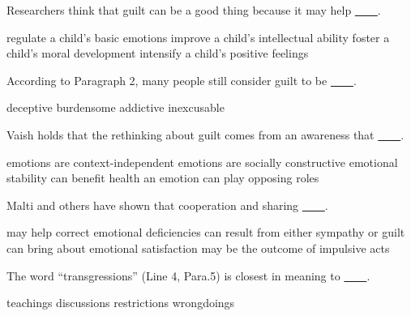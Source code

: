 \item Researchers think that guilt can be a good thing because it may help \uline{~~~~}.
\begin{tasks}
	\task regulate a child's basic emotions
	\task improve a child's intellectual ability
	\task foster a child's moral development
	\task intensify a child's positive feelings
\end{tasks}
\item According to Paragraph 2, many people still consider guilt to be \uline{~~~~}.
\begin{tasks}
	\task deceptive
	\task burdensome
	\task addictive
	\task inexcusable
\end{tasks}
\item Vaish holds that the rethinking about guilt comes from an awareness that \uline{~~~~}.
\begin{tasks}
	\task emotions are context-independent
	\task emotions are socially constructive
	\task emotional stability can benefit health
	\task an emotion can play opposing roles
\end{tasks}
\item Malti and others have shown that cooperation and sharing \uline{~~~~}.
\begin{tasks}
	\task may help correct emotional deficiencies
	\task can result from either sympathy or guilt
	\task can bring about emotional satisfaction
	\task may be the outcome of impulsive acts
\end{tasks}
\item The word ``transgressions'' (Line 4, Para.5) is closest in meaning to \uline{~~~~}.
\begin{tasks}
	\task teachings
	\task discussions
	\task restrictions
	\task wrongdoings
\end{tasks}